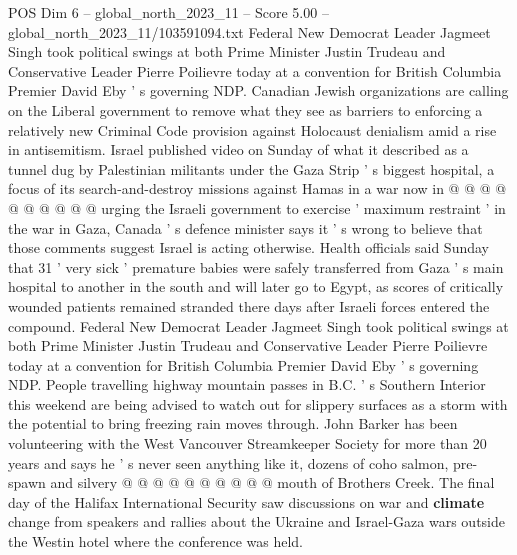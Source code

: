 \begin{textsample}{POS Dim 6 – global\_north\_2023\_11 – Score 5.00 – global\_north\_2023\_11/103591094.txt}
Federal New Democrat Leader Jagmeet Singh took political swings at both Prime Minister Justin Trudeau and Conservative Leader Pierre Poilievre today at a convention for British Columbia Premier David Eby ' s governing NDP.
Canadian Jewish organizations are calling on the Liberal government to remove what they see as barriers to enforcing a relatively new Criminal Code provision against Holocaust denialism amid a rise in antisemitism.
Israel published video on Sunday of what it described as a tunnel dug by Palestinian militants under the Gaza Strip ' s biggest hospital, a focus of its search-and-destroy missions against Hamas in a war now in @ @ @ @ @ @ @ @ @ @ urging the Israeli government to exercise ' maximum restraint ' in the war in Gaza, Canada ' s defence minister says it ' s wrong to believe that those comments suggest Israel is acting otherwise.
Health officials said Sunday that 31 ' very sick ' premature babies were safely transferred from Gaza ' s main hospital to another in the south and will later go to Egypt, as scores of critically wounded patients remained stranded there days after Israeli forces entered the compound.
Federal New Democrat Leader Jagmeet Singh took political swings at both Prime Minister Justin Trudeau and Conservative Leader Pierre Poilievre today at a convention for British Columbia Premier David Eby ' s governing NDP.
People travelling highway mountain passes in B.C. ' s Southern Interior this weekend are being advised to watch out for slippery surfaces as a storm with the potential to bring freezing rain moves through.
John Barker has been volunteering with the West Vancouver Streamkeeper Society for more than 20 years and says he ' s never seen anything like it, dozens of coho salmon, pre-spawn and silvery @ @ @ @ @ @ @ @ @ @ mouth of Brothers Creek.
The final day of the Halifax International Security saw discussions on war and \textbf{climate} change from speakers and rallies about the Ukraine and Israel-Gaza wars outside the Westin hotel where the conference was held.

\end{textsample}
